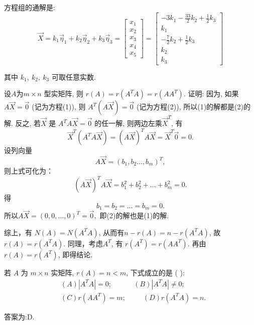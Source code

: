 \begin{eg}
方程组的通解是:
\begin{displaymath}
\vec{X}=k_1 \vec{\eta}_1+k_2\vec{\eta}_2+k_3\vec{\eta}_3=\begin{bmatrix}
x_1\\x_2\\x_3\\x_4\\x_5\end{bmatrix}=\begin{bmatrix}-3k_1-\frac{33}{2}k_2+\frac{1}{2}
k_3\\k_1\\-\frac{7}{2}k_2+\frac{1}{2}k_3\\k_2\\k_3\end{bmatrix}\end{displaymath}

其中 $k_1,\ k_2,\ k_3$ 可取任意实数.
\end{eg}

\begin{eg}
设$A$为$m \times n$ 型实矩阵,  则 $r(A) = r(A^TA) = r(AA^T)$.
证明: 因为, 如果 $A\vec{X}=\vec{0}$ (记为方程(1)), 则 $A^T(A\vec{X})=\vec{0}$ (记为方程(2)), 所以(1)的解都是(2)的解. 反之, 若$\vec{X}$ 是 $A^TA\vec{X}=\vec{0}$ 的任一解,  则两边左乘$\vec{X}^T$, 有
\begin{displaymath}
\vec{X}^T(A^TA\vec{X})=(A\vec{X})^TA\vec{X}=\vec{X}^T\vec{0}=0.
\end{displaymath}
设列向量 $$A\vec{X}=(b_1,b_2\dots,b_m)^T,$$
则上式可化为：
$$(A\vec{X})^TA\vec{X}=b_1^2+b_2^2+\dots+b_m^2=0.$$
得$$b_1=b_2=\dots=b_m=0.$$
所以$A\vec{X}=(0,0,\dots,0)^T=\vec{0},$ 即(2)的解也是(1)的解.

综上，有 $N(A)=N(A^TA)$, 从而有$n-r(A) = n-r(A^TA)$, 故$r(A) = r(A^TA)$.
同理，考虑$A^T$, 有 $r(A^T) = r(AA^T)$. 再由$r(A)=r(A^T)$, 即得结论.
\end{eg}

\begin{eg}
若 $A$ 为 $m\times n$ 实矩阵, $r(A) = n < m$, 下式成立的是 (     ):
\begin{displaymath}
\begin{aligned}
&(A) |A^TA|=0; \ \ \ \ \ \ \ \ \ \ \ \ \ \ (B)|A^TA|\not=0;  \\
&(C) r(AA^T)=m;\ \ \ \ \ \ \ \ \ \ \ (D)r(A^TA)=n.
\end{aligned}
\end{displaymath}

答案为:D.
\end{eg}

